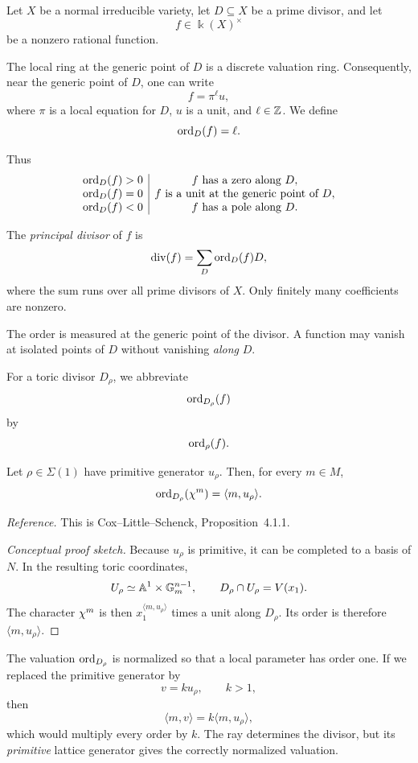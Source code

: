 \begin{agcheatsheet}
Let \(X\) be a normal irreducible variety, let \(D\subseteq X\) be a
prime divisor, and let
\[
f\in\Bbbk(X)^\times
\]
be a nonzero rational function.

The local ring at the generic point of \(D\) is a discrete valuation
ring. Consequently, near the generic point of \(D\), one can write
\[
f=\pi^\ell u,
\]
where \(\pi\) is a local equation for \(D\), \(u\) is a unit, and
\(\ell\in\mathbb{Z}\). We define
\[
\operatorname{ord}_D(f)=\ell.
\]

Thus
\[
\begin{array}{c|c}
\operatorname{ord}_D(f)>0 & f\text{ has a zero along }D,\\
\operatorname{ord}_D(f)=0 & f\text{ is a unit at the generic point of }D,\\
\operatorname{ord}_D(f)<0 & f\text{ has a pole along }D.
\end{array}
\]

The \emph{principal divisor} of \(f\) is
\[
\operatorname{div}(f)
=
\sum_D\operatorname{ord}_D(f)D,
\]
where the sum runs over all prime divisors of \(X\). Only finitely
many coefficients are nonzero.
\end{agcheatsheet}

The order is measured at the generic point of the divisor. A function
may vanish at isolated points of \(D\) without vanishing
\emph{along} \(D\).

For a toric divisor \(D_\rho\), we abbreviate
\[
\operatorname{ord}_{D_\rho}(f)
\]
by
\[
\operatorname{ord}_\rho(f).
\]

\begin{proposition}
\label{prop:order-character-ray}
Let \(\rho\in\Sigma(1)\) have primitive generator \(u_\rho\). Then,
for every \(m\in M\),
\[
\operatorname{ord}_{D_\rho}(\chi^{m})
=
\langle m,u_\rho\rangle.
\]
\end{proposition}

\noindent
\textit{Reference.}
This is Cox--Little--Schenck, Proposition~4.1.1.

\begin{proof}[Conceptual proof sketch]
Because \(u_\rho\) is primitive, it can be completed to a basis of
\(N\). In the resulting toric coordinates,
\[
U_\rho\simeq\mathbb{A}^1\times\mathbb{G}_{m}^{n-1},
\qquad
D_\rho\cap U_\rho=V(x_1).
\]
The character \(\chi^{m}\) is then \(x_1^{\langle
m,u_\rho\rangle}\) times a unit along \(D_\rho\). Its order is
therefore \(\langle m,u_\rho\rangle\).
\end{proof}

\begin{remark}
The valuation \(\operatorname{ord}_{D_\rho}\) is normalized so that a local
parameter has order one. If we replaced the primitive generator by
\[
v=k u_\rho,
\qquad k>1,
\]
then
\[
\langle m,v\rangle
=
k\langle m,u_\rho\rangle,
\]
which would multiply every order by \(k\). The ray determines the
divisor, but its \emph{primitive} lattice generator gives the correctly
normalized valuation.
\end{remark}

